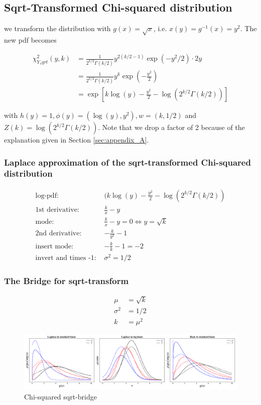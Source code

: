 \subsection{Sqrt-Transformed Chi-squared distribution}

we transform the distribution with $g(x) = \sqrt{x}$, i.e. $x(y) = g^{-1}(x) = y^2$. The new pdf becomes

\begin{subequations}
\begin{align}
\chi^2_{Y_sqrt}(y,k) &= \frac{1}{2^{k/2}\Gamma(k/2)}  y^{2(k/2 -1)} \exp(-y^2/2) \cdot 2y \\
		 &= \frac{1}{2^{k/2}\Gamma(k/2)}  y^{k} \exp(-\frac{y^2}{2}) \\
		 &= \exp \left[k\log(y) - \frac{y^2}{2} - \log(2^{k/2}\Gamma(k/2))\right]
\end{align}
\end{subequations}

with $h(y) = 1, \phi(y)=(\log(y), y^2), w=(k, 1/2)$ and $Z(k) =  \log(2^{k/2}\Gamma(k/2))$. Note that we drop a factor of 2 because of the explanation given in Section \ref{sec:appendix_A}.

\subsubsection{Laplace approximation of the sqrt-transformed Chi-squared distribution}

\begin{align*}
\text{log-pdf: } &(k\log(y) - \frac{y^2}{2} - \log(2^{k/2}\Gamma(k/2)) \\
\text{1st derivative: }&  \frac{k}{x} -y \\
\text{mode: }& \frac{k}{x} -y = 0 \Leftrightarrow y = \sqrt{k}\\
\text{2nd derivative: }&  -\frac{k}{y^2} - 1\\
\text{insert mode: }& -\frac{k}{k}-1 = -2\\
\text{invert and times -1: }&\sigma^2 = 1/2
\end{align*}

\subsubsection{The Bridge for sqrt-transform}

\begin{subequations}
\begin{align}
\mu &= \sqrt{k} \\
\sigma^2 &= 1/2 \\
k &= \mu^2
\end{align}
\end{subequations}

\begin{figure}[!htb]
	\centering
	\includegraphics[width=\textwidth]{figures/chi2_sqrt_bridge.pdf}
	\caption{Chi-squared sqrt-bridge}
	\label{fig:chi2_sqrt_bridge}
\end{figure}